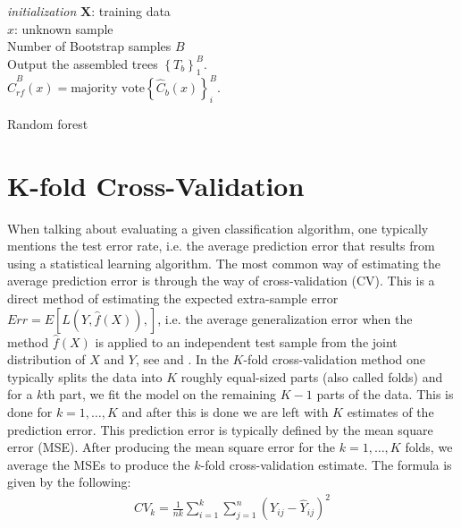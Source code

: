 \documentclass[../thesis.tex]{subfiles}
\begin{document}
\begin{algorithm}[H]{
\SetAlgoLined
\textit{initialization}\;
    \hspace{0.5cm} $\mathbf{X}$: training data\\
    \hspace{0.5cm} $x$: unknown sample\\
    \hspace{0.5cm} Number of Bootstrap samples $B$\\
    Output the assembled trees $\left\{T_b \right\}^B_1$.\\ 
    \Return $\hat{C}^B_{rf}(x) = \text{majority vote}\left\{\hat{C}_b(x)\right\}^B_i$.
}
\caption{Random forest}
\end{algorithm}
\newpage
\section{K-fold Cross-Validation}
\label{sec:validation}

\noindent When talking about evaluating a given classification algorithm, one typically mentions the test error rate, i.e. the average prediction error that results from using a statistical learning algorithm. The most common way of estimating the average prediction error is through the way of cross-validation (CV). This is a direct method of estimating the expected extra-sample error $Err = E\left[L\left(Y, \hat{f}\left(X \right) \right), \right]$, i.e. the average generalization error when the method $\hat{f}\left(X \right)$ is applied to an independent test sample from the joint distribution of $X$ and $Y$, see \citep{friedman2009elements} and \citep{james2013introduction}. In the $K$-fold cross-validation method \citep{geisser1975predictive} one typically splits the data into $K$ roughly equal-sized parts (also called folds) and for a $k$th part, we fit the model on the remaining $K-1$ parts of the data. This is done for $k = 1, \hdots, K$ and after this is done we are left with $K$ estimates of the prediction error. This prediction error is typically defined by the mean square error (MSE). After producing the mean square error for the $k = 1, \hdots, K$ folds, we average the MSEs to produce the $k$-fold cross-validation estimate. The formula is given by the following:
\begin{align}
    CV_k = \frac{1}{nk}\sum_{i=1}^k\sum_{j=1}^n\left(Y_{ij} - \hat{Y}_{ij} \right)^2
\end{align}
\end{document}
